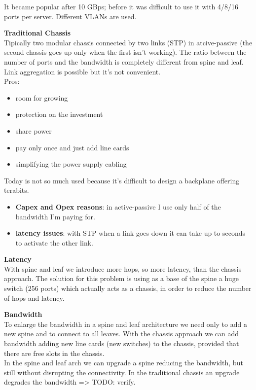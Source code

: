 It became popular after 10 GBps; before it was difficult to use it with
4/8/16 ports per server. Different VLANs are used.

\textbf{Traditional Chassis}\\
Tipically two modular chassis connected by two links (STP) in
atcive-passive (the second chassis goes up only when the first isn't
working). The ratio between the number of ports and the bandwidth is
completely different from spine and leaf. Link aggregation is possible
but it's not convenient.\\
Pros:

\begin{itemize}
\item
  room for growing
\item
  protection on the investment
\item
  share power
\item
  pay only once and just add line cards
\item
  simplifying the power supply cabling
\end{itemize}

Today is not so much used because it's difficult to design a backplane
offering terabits.

\begin{itemize}
\item
  \textbf{Capex and Opex reasons}: in active-passive I use only half of
  the bandwidth I'm paying for.
\item
  \textbf{latency issues}: with STP when a link goes down it can take up
  to seconds to activate the other link.
\end{itemize}

\textbf{Latency}\\
With spine and leaf we introduce more hops, so more latency, than the
chassis approach. The solution for this problem is using as a base of
the spine a huge switch (256 ports) which actually acts as a chassis, in
order to reduce the number of hops and latency.

\textbf{Bandwidth}\\
To enlarge the bandwidth in a spine and leaf architecture we need only
to add a new spine and to connect to all leaves. With the chassis
approach we can add bandwidth adding new line cards (new switches) to
the chassis, provided that there are free slots in the chassis.\\
In the spine and leaf arch we can upgrade a spine reducing  the
bandwidth, but still without disrupting the connectivity. In the
traditional chassis an upgrade degrades the bandwidth =\textgreater{}
TODO: verify.

